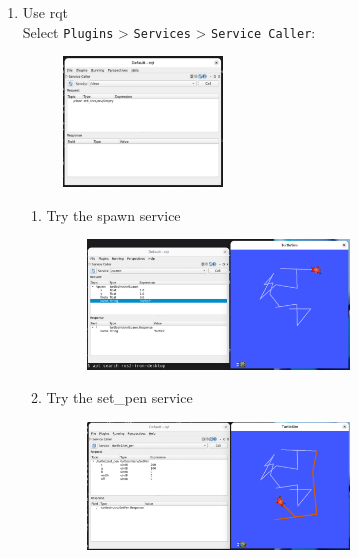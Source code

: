 \documentclass[12pt, a4paper]{article}
\begin{document}
\begin{enumerate}
\begin{figure}[h]
\end{figure}
\newpage
\item Use rqt\\
	Select \texttt{Plugins} > \texttt{Services} > \texttt{Service Caller}:
\begin{figure}[h]
	\centering
	\includegraphics[width=0.4\textwidth]{p1.2-9}
\end{figure}
\begin{enumerate}
	\item Try the spawn service
\begin{figure}[h]
	\centering
	\includegraphics[width=0.7\textwidth]{p1.2-10}
\end{figure}
	\item Try the set\_pen service
\begin{figure}[h]
	\centering
	\includegraphics[width=0.7\textwidth]{p1.2-11}
\end{figure}


\end{enumerate}
\end{enumerate}
\end{document}
